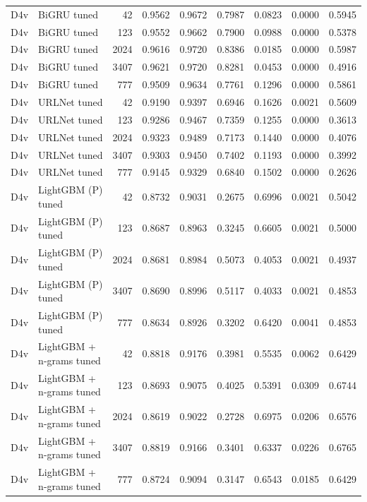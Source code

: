 \begin{table}[t]
\begin{tabular}{llrrrrrrr}
D4v & BiGRU tuned & 42 & 0.9562 & 0.9672 & 0.7987 & 0.0823 & 0.0000 & 0.5945 \\
D4v & BiGRU tuned & 123 & 0.9552 & 0.9662 & 0.7900 & 0.0988 & 0.0000 & 0.5378 \\
D4v & BiGRU tuned & 2024 & 0.9616 & 0.9720 & 0.8386 & 0.0185 & 0.0000 & 0.5987 \\
D4v & BiGRU tuned & 3407 & 0.9621 & 0.9720 & 0.8281 & 0.0453 & 0.0000 & 0.4916 \\
D4v & BiGRU tuned & 777 & 0.9509 & 0.9634 & 0.7761 & 0.1296 & 0.0000 & 0.5861 \\
D4v & URLNet tuned & 42 & 0.9190 & 0.9397 & 0.6946 & 0.1626 & 0.0021 & 0.5609 \\
D4v & URLNet tuned & 123 & 0.9286 & 0.9467 & 0.7359 & 0.1255 & 0.0000 & 0.3613 \\
D4v & URLNet tuned & 2024 & 0.9323 & 0.9489 & 0.7173 & 0.1440 & 0.0000 & 0.4076 \\
D4v & URLNet tuned & 3407 & 0.9303 & 0.9450 & 0.7402 & 0.1193 & 0.0000 & 0.3992 \\
D4v & URLNet tuned & 777 & 0.9145 & 0.9329 & 0.6840 & 0.1502 & 0.0000 & 0.2626 \\
D4v & LightGBM (P) tuned & 42 & 0.8732 & 0.9031 & 0.2675 & 0.6996 & 0.0021 & 0.5042 \\
D4v & LightGBM (P) tuned & 123 & 0.8687 & 0.8963 & 0.3245 & 0.6605 & 0.0021 & 0.5000 \\
D4v & LightGBM (P) tuned & 2024 & 0.8681 & 0.8984 & 0.5073 & 0.4053 & 0.0021 & 0.4937 \\
D4v & LightGBM (P) tuned & 3407 & 0.8690 & 0.8996 & 0.5117 & 0.4033 & 0.0021 & 0.4853 \\
D4v & LightGBM (P) tuned & 777 & 0.8634 & 0.8926 & 0.3202 & 0.6420 & 0.0041 & 0.4853 \\
D4v & LightGBM + n-grams tuned & 42 & 0.8818 & 0.9176 & 0.3981 & 0.5535 & 0.0062 & 0.6429 \\
D4v & LightGBM + n-grams tuned & 123 & 0.8693 & 0.9075 & 0.4025 & 0.5391 & 0.0309 & 0.6744 \\
D4v & LightGBM + n-grams tuned & 2024 & 0.8619 & 0.9022 & 0.2728 & 0.6975 & 0.0206 & 0.6576 \\
D4v & LightGBM + n-grams tuned & 3407 & 0.8819 & 0.9166 & 0.3401 & 0.6337 & 0.0226 & 0.6765 \\
D4v & LightGBM + n-grams tuned & 777 & 0.8724 & 0.9094 & 0.3147 & 0.6543 & 0.0185 & 0.6429 \\
\bottomrule
\end{tabular}
\end{table}